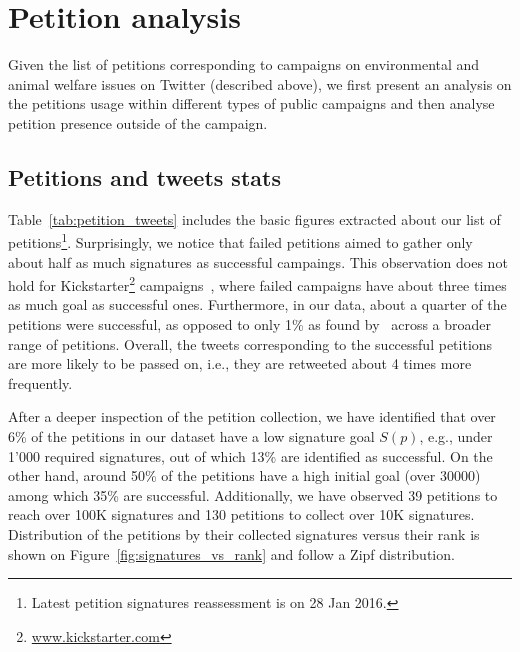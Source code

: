 \section{Petition analysis}
\label{sec:petition_analysis}

Given the list of petitions corresponding to campaigns on environmental and animal  welfare issues on Twitter (described above), we first present an analysis on the petitions usage within different types of public campaigns and then analyse petition presence  outside of the campaign.

\subsection{Petitions and tweets stats}
Table~\ref{tab:petition_tweets} includes the basic figures extracted about our list of petitions\footnote{Latest petition signatures reassessment is on 28 Jan 2016.}.
Surprisingly, we notice that failed petitions aimed to gather only about half as much signatures as successful campaings. This observation does not hold for Kickstarter\footnote{\url{www.kickstarter.com}} campaigns~\cite{Etter2013}, where failed campaigns have about three times as much goal  as successful ones.
Furthermore, in our data, about a quarter of the petitions were successful, as opposed to only 1\% as found by~\cite{Huang2015} across a broader range of petitions.
Overall, the tweets corresponding to the successful petitions are more likely to be passed on, i.e., they are retweeted about 4 times more frequently.

After a deeper inspection of the petition collection, we have identified that over 6\% of the petitions in our dataset have a low signature goal $S(p)$, e.g., under 1'000 required signatures, out of which 13\% are identified as successful.
On the other hand, around 50\% of the petitions have a high initial goal (over \num{30000}) among which 35\% are successful.
Additionally, we have observed 39 petitions to reach over 100K signatures and 130 petitions to collect over 10K signatures.
Distribution of the petitions by their collected signatures versus their rank is shown on Figure~\ref{fig:signatures_vs_rank} and follow a Zipf distribution.

